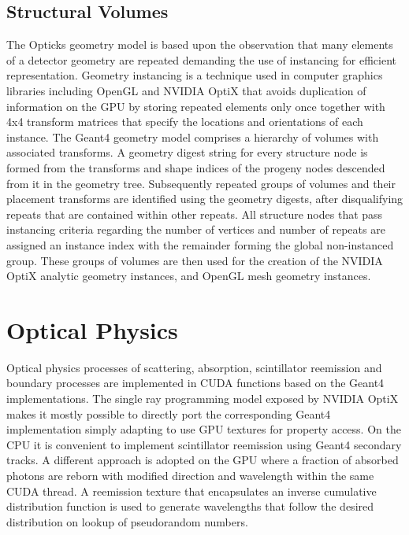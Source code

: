 \documentclass{webofc}
\begin{document}
%
%
%
\subsection{Structural Volumes}%
%
The Opticks geometry model is based upon the observation that many elements of a detector 
geometry are repeated demanding the use of instancing for efficient representation.  Geometry instancing 
is a technique used in computer graphics libraries including OpenGL and NVIDIA OptiX that avoids 
duplication of information on the GPU by storing repeated elements only once together with 4x4 transform matrices 
that specify the locations and orientations of each instance.
The Geant4 geometry model comprises a hierarchy of volumes with associated transforms. 
A geometry digest string for every structure node is formed from the transforms and shape indices of the progeny nodes descended from it in the geometry tree. 
Subsequently repeated groups of volumes and their placement transforms are identified using the geometry digests, after disqualifying repeats
that are contained within other repeats. 
All structure nodes that pass instancing criteria regarding the number of vertices and number of repeats are assigned an instance index
with the remainder forming the global non-instanced group. 
These groups of volumes are then used for the creation of the NVIDIA OptiX analytic geometry instances, and OpenGL mesh geometry instances.  
%
\section{Optical Physics}%
%
Optical physics processes of scattering, absorption, scintillator reemission and 
boundary processes are implemented in CUDA functions based on the Geant4
implementations. 
%
The single ray programming model exposed by NVIDIA OptiX makes it mostly possible 
to directly port the corresponding Geant4 implementation simply 
adapting to use GPU textures for property access. 
%
On the CPU it is convenient to implement scintillator reemission using Geant4 secondary 
tracks. A different approach is adopted on the GPU where a fraction of absorbed photons
are reborn with modified direction and wavelength within the same CUDA thread. 
A reemission texture that encapsulates an inverse cumulative distribution function 
is used to generate wavelengths that follow the desired distribution on lookup of pseudorandom numbers. 
%
%
\end{document}
